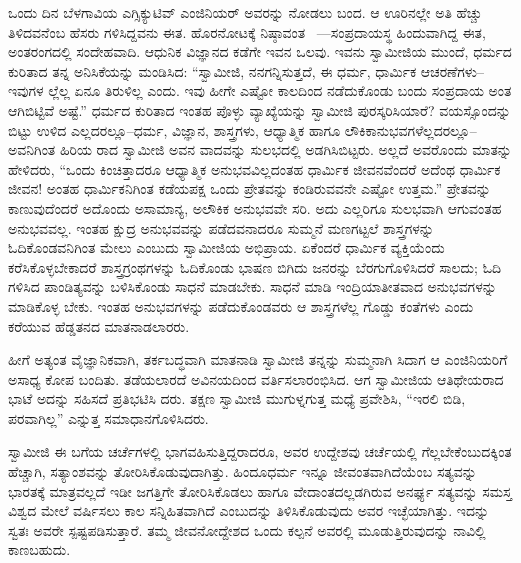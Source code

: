 ಒಂದು ದಿನ ಬೆಳಗಾವಿಯ ಎಗ್ಸಿಕ್ಯುಟಿವ್ ಎಂಜಿನಿಯರ್ ಅವರನ್ನು ನೋಡಲು ಬಂದ. ಆ ಊರಿನಲ್ಲೇ ಅತಿ ಹೆಚ್ಚು ತಿಳಿದವನೆಂಬ ಹೆಸರು ಗಳಿಸಿದ್ದವನು ಈತ. ಹೊರನೋಟಕ್ಕೆ ನಿಷ್ಠಾವಂತ ~—ಸಂಪ್ರದಾಯಸ್ಥ ಹಿಂದುವಾಗಿದ್ದ ಈತ, ಅಂತರಂಗದಲ್ಲಿ ಸಂದೇಹವಾದಿ. ಆಧುನಿಕ ವಿಜ್ಞಾನದ ಕಡೆಗೇ ಇವನ ಒಲವು. ಇವನು ಸ್ವಾಮೀಜಿಯ ಮುಂದೆ, ಧರ್ಮದ ಕುರಿತಾದ ತನ್ನ ಅನಿಸಿಕೆಯನ್ನು ಮಂಡಿಸಿದ: “ಸ್ವಾಮೀಜಿ, ನನಗನ್ನಿಸುತ್ತದೆ, ಈ ಧರ್ಮ, ಧಾರ್ಮಿಕ ಆಚರಣೆಗಳು–ಇವುಗಳ ಲ್ಲೆಲ್ಲ ಏನೂ ತಿರುಳಿಲ್ಲ ಎಂದು. ಇವು ಹೀಗೇ ಎಷ್ಟೋ ಕಾಲದಿಂದ ನಡೆದುಕೊಂಡು ಬಂದು ಸಂಪ್ರದಾಯ ಅಂತ ಆಗಿಬಿಟ್ಟಿವೆ ಅಷ್ಟೆ.” ಧರ್ಮದ ಕುರಿತಾದ ಇಂತಹ ಪೊಳ್ಳು ವ್ಯಾಖ್ಯೆಯನ್ನು ಸ್ವಾಮೀಜಿ ಪುರಸ್ಕರಿಸಿಯಾರೆ? ವಯಸ್ಸೊಂದನ್ನು ಬಿಟ್ಟು ಉಳಿದ ಎಲ್ಲದರಲ್ಲೂ–ಧರ್ಮ, ವಿಜ್ಞಾನ, ಶಾಸ್ತ್ರಗಳು, ಆಧ್ಯಾತ್ಮಿಕ ಹಾಗೂ ಲೌಕಿಕಾನುಭವಗಳೆಲ್ಲದರಲ್ಲೂ–ಅವನಿಗಿಂತ ಹಿರಿಯ ರಾದ ಸ್ವಾಮೀಜಿ ಅವನ ವಾದವನ್ನು ಸುಲಭದಲ್ಲಿ ಅಡಗಿಸಿಬಿಟ್ಟರು. ಅಲ್ಲದೆ ಅವರೊಂದು ಮಾತನ್ನು ಹೇಳಿದರು, “ಒಂದು ಕಿಂಚಿತ್ತಾದರೂ ಆಧ್ಯಾತ್ಮಿಕ ಅನುಭವವಿಲ್ಲದಂತಹ ಧಾರ್ಮಿಕ ಜೀವನವೆಂದರೆ ಅದೆಂಥ ಧಾರ್ಮಿಕ ಜೀವನ! ಅಂತಹ ಧಾರ್ಮಿಕನಿಗಿಂತ ಕಡೆಯಪಕ್ಷ ಒಂದು ಪ್ರೇತವನ್ನು ಕಂಡಿರುವವನೇ ಎಷ್ಟೋ ಉತ್ತಮ.” ಪ್ರೇತವನ್ನು ಕಾಣುವುದೆಂದರೆ ಅದೊಂದು ಅಸಾಮಾನ್ಯ, ಅಲೌಕಿಕ ಅನುಭವವೇ ಸರಿ. ಅದು ಎಲ್ಲರಿಗೂ ಸುಲಭವಾಗಿ ಆಗುವಂತಹ ಅನುಭವವಲ್ಲ. ಇಂತಹ ಕ್ಷುದ್ರ ಅನುಭವವನ್ನು ಪಡೆದವನಾದರೂ ಸುಮ್ಮನೆ ಮಣಗಟ್ಟಲೆ ಶಾಸ್ತ್ರಗಳನ್ನು ಓದಿಕೊಂಡವನಿಗಿಂತ ಮೇಲು ಎಂಬುದು ಸ್ವಾಮೀಜಿಯ ಅಭಿಪ್ರಾಯ. ಏಕೆಂದರೆ ಧಾರ್ಮಿಕ ವ್ಯಕ್ತಿಯೆಂದು ಕರೆಸಿಕೊಳ್ಳಬೇಕಾದರೆ ಶಾಸ್ತ್ರಗ್ರಂಥಗಳನ್ನು ಓದಿಕೊಂಡು ಭಾಷಣ ಬಿಗಿದು ಜನರನ್ನು ಬೆರಗುಗೊಳಿಸಿದರೆ ಸಾಲದು; ಓದಿ ಗಳಿಸಿದ ಪಾಂಡಿತ್ಯವನ್ನು ಬಳಿಸಿಕೊಂಡು ಸಾಧನೆ ಮಾಡಬೇಕು. ಸಾಧನೆ ಮಾಡಿ ಇಂದ್ರಿಯಾತೀತವಾದ ಅನುಭವಗಳನ್ನು ಮಾಡಿಕೊಳ್ಳ ಬೇಕು. ಇಂತಹ ಅನುಭವಗಳನ್ನು ಪಡೆದುಕೊಂಡವರು ಆ ಶಾಸ್ತ್ರಗಳೆಲ್ಲ ಗೊಡ್ಡು ಕಂತೆಗಳು ಎಂದು ಕರೆಯುವ ಹೆಡ್ಡತನದ ಮಾತನಾಡಲಾರರು.

ಹೀಗೆ ಅತ್ಯಂತ ವೈಜ್ಞಾನಿಕವಾಗಿ, ತರ್ಕಬದ್ಧವಾಗಿ ಮಾತನಾಡಿ ಸ್ವಾಮೀಜಿ ತನ್ನನ್ನು ಸುಮ್ಮನಾಗಿ ಸಿದಾಗ ಆ ಎಂಜಿನಿಯರಿಗೆ ಅಸಾಧ್ಯ ಕೋಪ ಬಂದಿತು. ತಡೆಯಲಾರದೆ ಅವಿನಯದಿಂದ ವರ್ತಿಸಲಾರಂಭಿಸಿದ. ಆಗ ಸ್ವಾಮೀಜಿಯ ಆತಿಥೇಯರಾದ ಭಾಟೆ ಅದನ್ನು ಸಹಿಸದೆ ಪ್ರತಿಭಟಿಸಿ ದರು. ತಕ್ಷಣ ಸ್ವಾಮೀಜಿ ಮುಗುಳ್ನಗುತ್ತ ಮಧ್ಯೆ ಪ್ರವೇಶಿಸಿ, “ಇರಲಿ ಬಿಡಿ, ಪರವಾಗಿಲ್ಲ” ಎನ್ನುತ್ತ ಸಮಾಧಾನಗೊಳಿಸಿದರು.

ಸ್ವಾಮೀಜಿ ಈ ಬಗೆಯ ಚರ್ಚೆಗಳಲ್ಲಿ ಭಾಗವಹಿಸುತ್ತಿದ್ದರಾದರೂ, ಅವರ ಉದ್ದೇಶವು ಚರ್ಚೆಯಲ್ಲಿ ಗೆಲ್ಲಬೇಕೆಂಬುದಕ್ಕಿಂತ ಹೆಚ್ಚಾಗಿ, ಸತ್ಯಾಂಶವನ್ನು ತೋರಿಸಿಕೊಡುವುದಾಗಿತ್ತು. ಹಿಂದೂಧರ್ಮ ಇನ್ನೂ ಜೀವಂತವಾಗಿದೆಯೆಂಬ ಸತ್ಯವನ್ನು ಭಾರತಕ್ಕೆ ಮಾತ್ರವಲ್ಲದೆ ಇಡೀ ಜಗತ್ತಿಗೇ ತೋರಿಸಿಕೊಡಲು ಹಾಗೂ ವೇದಾಂತದಲ್ಲಡಗಿರುವ ಅನರ್ಘ್ಯ ಸತ್ಯವನ್ನು ಸಮಸ್ತ ವಿಶ್ವದ ಮೇಲೆ ವರ್ಷಿಸಲು ಕಾಲ ಸನ್ನಿಹಿತವಾಗಿದೆ ಎಂಬುದನ್ನು ತಿಳಿಸಿಕೊಡುವುದು ಅವರ ಇಚ್ಛೆಯಾಗಿತ್ತು. ಇದನ್ನು ಸ್ವತಃ ಅವರೇ ಸ್ಪಷ್ಟಪಡಿಸುತ್ತಾರೆ. ತಮ್ಮ ಜೀವನೋದ್ದೇಶದ ಒಂದು ಕಲ್ಪನೆ ಅವರಲ್ಲಿ ಮೂಡುತ್ತಿರುವುದನ್ನು ನಾವಿಲ್ಲಿ ಕಾಣಬಹುದು.

